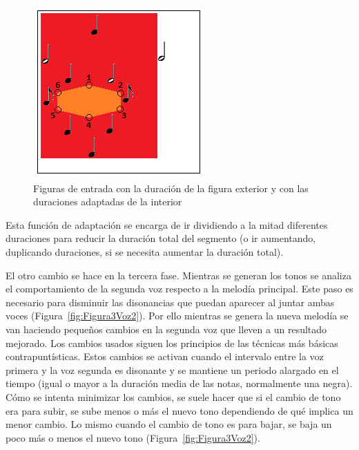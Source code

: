 		\begin{figure}[htbp]
		\centering
		\hspace*{0.0in}
		\includegraphics[scale=1]{graphics/simpletest4-F2_2.png}
		\caption{Figuras de entrada con la duración de la figura exterior y con las duraciones adaptadas de la interior}
		\label{fig:Figura2Voz2}
		\end{figure}

Esta función de adaptación se encarga de ir dividiendo a la mitad diferentes duraciones para reducir la duración total del segmento (o ir aumentando, duplicando duraciones, si se necesita aumentar la duración total). 

El otro cambio se hace en la tercera fase. Mientras se generan los tonos se analiza el comportamiento de la segunda voz respecto a la melodía principal. Este paso es necesario para disminuir las disonancias que puedan aparecer al juntar ambas voces (Figura~\ref{fig:Figura3Voz2}). Por ello mientras se genera la nueva melodía se van haciendo pequeños cambios en la segunda voz que lleven a un resultado mejorado. Los cambios usados siguen los principios de las técnicas más básicas contrapuntísticas. Estos cambios se activan cuando el intervalo entre la voz primera y la voz segunda es disonante y se mantiene un periodo alargado en el tiempo (igual o mayor a la duración media de las notas, normalmente una negra). Cómo se intenta minimizar los cambios, se suele hacer que si el cambio de tono era para subir, se sube menos o más el nuevo tono dependiendo de qué implica un menor cambio. Lo mismo cuando el cambio de tono es para bajar, se baja un poco más o menos el nuevo tono (Figura~\ref{fig:Figura3Voz2}).

